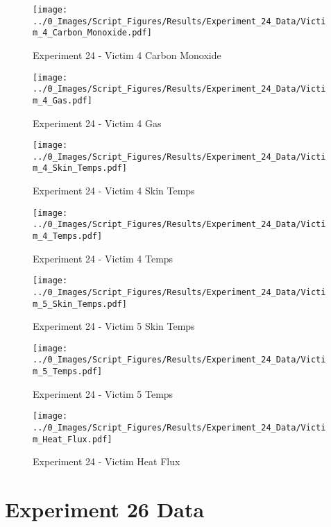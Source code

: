 	\begin{figure}[H]
		\centering
		\texttt{[image: ../0\_Images/Script\_Figures/Results/Experiment\_24\_Data/Victim\_4\_Carbon\_Monoxide.pdf]}
		\caption[]{Experiment 24 - Victim 4 Carbon Monoxide}
	\end{figure}
 
	\clearpage

	\begin{figure}[H]
		\centering
		\texttt{[image: ../0\_Images/Script\_Figures/Results/Experiment\_24\_Data/Victim\_4\_Gas.pdf]}
		\caption[]{Experiment 24 - Victim 4 Gas}
	\end{figure}
 

	\begin{figure}[H]
		\centering
		\texttt{[image: ../0\_Images/Script\_Figures/Results/Experiment\_24\_Data/Victim\_4\_Skin\_Temps.pdf]}
		\caption[]{Experiment 24 - Victim 4 Skin Temps}
	\end{figure}
 
	\clearpage

	\begin{figure}[H]
		\centering
		\texttt{[image: ../0\_Images/Script\_Figures/Results/Experiment\_24\_Data/Victim\_4\_Temps.pdf]}
		\caption[]{Experiment 24 - Victim 4 Temps}
	\end{figure}
 

	\begin{figure}[H]
		\centering
		\texttt{[image: ../0\_Images/Script\_Figures/Results/Experiment\_24\_Data/Victim\_5\_Skin\_Temps.pdf]}
		\caption[]{Experiment 24 - Victim 5 Skin Temps}
	\end{figure}
 
	\clearpage

	\begin{figure}[H]
		\centering
		\texttt{[image: ../0\_Images/Script\_Figures/Results/Experiment\_24\_Data/Victim\_5\_Temps.pdf]}
		\caption[]{Experiment 24 - Victim 5 Temps}
	\end{figure}
 

	\begin{figure}[H]
		\centering
		\texttt{[image: ../0\_Images/Script\_Figures/Results/Experiment\_24\_Data/Victim\_Heat\_Flux.pdf]}
		\caption[]{Experiment 24 - Victim Heat Flux}
	\end{figure}
 
	\clearpage

\clearpage		\large
\section{Experiment 26 Data} \label{App:Exp26Results} 

